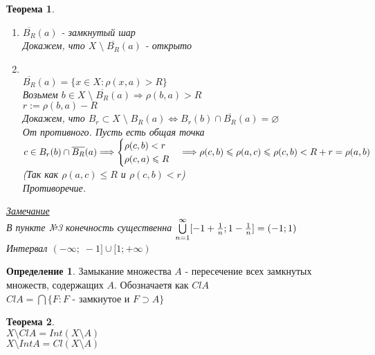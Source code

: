 \documentclass[12pt,letterpaper]{report}
\makeatletter
\newtheorem*{theorem-non}{Теорема}
\theoremstyle{definition}
\newtheorem*{conj}{Определение}
\newcommand{\notice}{\underline{\textit{Замечание }}}
\renewenvironment{proof}[1][\proofname]{%
   \par\pushQED{\qed}\normalfont%
   \topsep6\p@\@plus6\p@\relax
   \trivlist\item[\hskip\labelsep\bfseries#1\@addpunct{.}]%
   \ignorespaces
}{%
   \popQED\endtrivlist\@endpefalse
}
\makeatother
\begin{document}
\begin{theorem-non}
\begin{proof}
\begin{enumerate}
            \item[4.] $\overline{B_R}(a)$ - замкнутый шар\\
            Докажем, что $X \; \setminus \; \overline{B_R}(a)$ - открыто
            \begin{proof}
                \quad \\
                $\overline{B_R}(a) = \{x \in X: \rho(x, a) > R\}$ \\
                Возьмем $b \in X \; \setminus \; \overline{B_R}(a) \Longrightarrow \rho(b, a) > R$ \\
                $r := \rho(b, a) - R$ \\
                Докажем, что $B_r \subset X \; \setminus \; B_R(a) \Longleftrightarrow B_r(b) \cap \overline{B_R}(a) = \varnothing$ \\
                От противного. Пусть есть общая точка $c \in B_r(b) \cap \overline{B_R}(a) \Longrightarrow 
                \begin{cases}
                    \rho(c, b) < r \\
                    \rho(c, a) \leqslant R
                \end{cases} \Longrightarrow \vspace{0,2cm}\\
                \rho(c, b) \leqslant \rho(a, c) \leqslant \rho(c, b) < R + r = \rho(a,b)$ \qquad (Так как $\rho(a, c) \leqslant R$ и $\rho(c, b) < r$) \\
                Противоречие.
            \end{proof} 
        \end{enumerate}
    \end{proof}
    \notice \\
    В пункте №3 конечность существенна
    $\bigcup\limits_{n=1}^{\infty}[-1 + {{1}\over{n}}; 1 - {{1}\over{n}}] = (-1; 1)$ \\ Интервал $(-\infty; \; -1] \cup [1; +\infty)$
\end{theorem-non}
\begin{conj}
    Замыкание множества $A$ - пересечение всех замкнутых множеств, содержащих $A$. Обозначаетя как $Cl A$ \\
    $Cl A = \bigcap \{ F: F $ - замкнутое и $ F \supset A \}$ 
\end{conj}
\begin{theorem-non}
    \quad \\
    $X \setminus Cl A = Int(X \setminus A)$ \\
    $X \setminus Int A = Cl(X \setminus A)$
\end{theorem-non}
\end{document}
